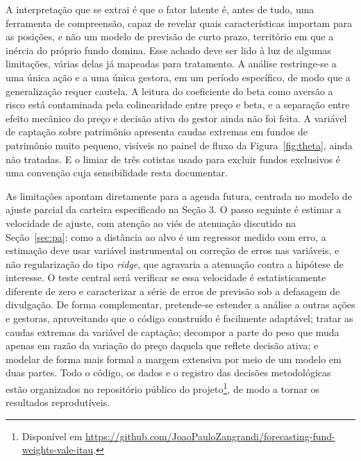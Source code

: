 \documentclass[12pt,a4paper]{article}
\begin{document}
A interpretação que se extrai é que o fator latente é, antes de tudo, uma ferramenta de
compreensão, capaz de revelar quais características importam para as posições, e não um modelo de
previsão de curto prazo, território em que a inércia do próprio fundo domina. Esse achado deve ser
lido à luz de algumas limitações, várias delas já mapeadas para tratamento. A análise restringe-se
a uma única ação e a uma única gestora, em um período específico, de modo que a generalização
requer cautela. A leitura do coeficiente do beta como aversão a risco está contaminada pela
colinearidade entre preço e beta, e a separação entre efeito mecânico do preço e decisão ativa do
gestor ainda não foi feita. A variável de captação sobre patrimônio apresenta caudas extremas em
fundos de patrimônio muito pequeno, visíveis no painel de fluxo da Figura~\ref{fig:theta}, ainda
não tratadas. E o limiar de três cotistas usado para excluir fundos exclusivos é uma convenção
cuja sensibilidade resta documentar.

As limitações apontam diretamente para a agenda futura, centrada no modelo de ajuste parcial da
carteira especificado na Seção 3. O passo seguinte é estimar a velocidade de ajuste, com atenção
ao viés de atenuação discutido na Seção~\ref{sec:pa}: como a distância ao alvo é um regressor
medido com erro, a estimação deve usar variável instrumental ou correção de erros nas variáveis, e
não regularização do tipo \emph{ridge}, que agravaria a atenuação contra a hipótese de interesse.
O teste central será verificar se essa velocidade é estatisticamente diferente de zero e
caracterizar a série de erros de previsão sob a defasagem de divulgação. De forma complementar,
pretende-se estender a análise a outras ações e gestoras, aproveitando que o código construído é
facilmente adaptável; tratar as caudas extremas da variável de captação; decompor a parte do peso
que muda apenas em razão da variação do preço daquela que reflete decisão ativa; e modelar de
forma mais formal a margem extensiva por meio de um modelo em duas partes. Todo o código, os dados
e o registro das decisões metodológicas estão organizados no repositório público do
projeto\footnote{Disponível em \url{https://github.com/JoaoPauloZangrandi/forecasting-fund-weights-vale-itau}.},
de modo a tornar os resultados reprodutíveis.

\newpage
{}
\end{document}
